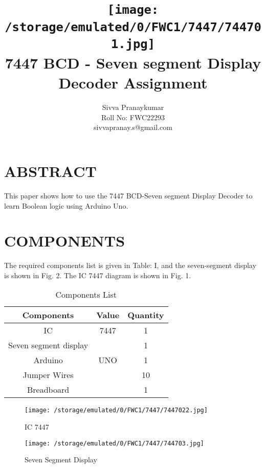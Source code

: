 \documentclass[conference]{IEEEtran}
\title{
\vspace{1cm}
{\texttt{[image: /storage/emulated/0/FWC1/7447/744701.jpg]} \\ 
7447 BCD - Seven segment Display Decoder Assignment} }
\author{Sivva Pranaykumar\\ Roll No: FWC22293 \\sivvapranay.s@gmail.com}
\begin{document}
\maketitle

\section{ABSTRACT}
This paper shows how to use the 7447 BCD-Seven segment Display Decoder to learn Boolean logic using Arduino Uno.

\section{COMPONENTS}
The required components list is given in Table: I, and the seven-segment display is shown in Fig. 2. The IC 7447 diagram is shown in Fig. 1.
\vspace{0.3cm}

\begin{table}[htbp]
\centering
\begin{tabular}{| c | c | c |}
\hline
Components & Value & Quantity \\
\hline
IC & 7447 & 1 \\
\hline
Seven segment display & & 1 \\
\hline
Arduino & UNO & 1 \\
\hline
Jumper Wires & & 10 \\
\hline
Breadboard & & 1 \\
\hline
\end{tabular}
\vspace{0.3cm}
\caption{\label{tab:widgets} Components List}
\end{table}

\begin{figure}[htbp]                           
\centering                            
\texttt{[image: /storage/emulated/0/FWC1/7447/7447022.jpg]}                      
\caption{\label{fig-1:Gates} IC 7447}           
\end{figure}

\begin{figure}[htbp]                           
\centering                                 
\texttt{[image: /storage/emulated/0/FWC1/7447/744703.jpg]}                                           
\caption{\label{fig-2:Gates} Seven Segment Display}               
\end{figure}
\end{document}
